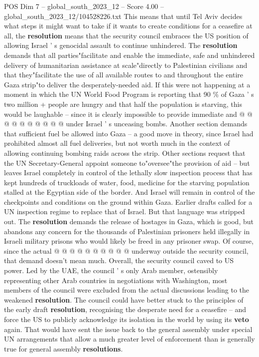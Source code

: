 \begin{textsample}{POS Dim 7 – global\_south\_2023\_12 – Score 4.00 – global\_south\_2023\_12/104528226.txt}
This means that until Tel Aviv decides what steps it might want to take if it wants to create conditions for a ceasefire at all, the \textbf{resolution} means that the security council embraces the US position of allowing Israel ' s genocidal assault to continue unhindered.
The \textbf{resolution} demands that all parties"facilitate and enable the immediate, safe and unhindered delivery of humanitarian assistance at scale"directly to Palestinian civilians and that they"facilitate the use of all available routes to and throughout the entire Gaza strip"to deliver the desperately-needed aid.
If this were not happening at a moment in which the UN World Food Program is reporting that 90 \% of Gaza ' s two million + people are hungry and that half the population is starving, this would be laughable -- since it is clearly impossible to provide immediate and @ @ @ @ @ @ @ @ @ @ under Israel ' s unceasing bombs.
Another section demands that sufficient fuel be allowed into Gaza -- a good move in theory, since Israel had prohibited almost all fuel deliveries, but not worth much in the context of allowing continuing bombing raids across the strip.
Other sections request that the UN Secretary-General appoint someone to"oversee"the provision of aid -- but leaves Israel completely in control of the lethally slow inspection process that has kept hundreds of truckloads of water, food, medicine for the starving population stalled at the Egyptian side of the border.
And Israel will remain in control of the checkpoints and conditions on the ground within Gaza.
Earlier drafts called for a UN inspection regime to replace that of Israel.
But that language was stripped out.
The \textbf{resolution} demands the release of hostages in Gaza, which is good, but abandons any concern for the thousands of Palestinian prisoners held illegally in Israeli military prisons who would likely be freed in any prisoner swap.
Of course, since the actual @ @ @ @ @ @ @ @ @ @ underway outside the security council, that demand doesn't mean much.
Overall, the security council caved to US power.
Led by the UAE, the council ' s only Arab member, ostensibly representing other Arab countries in negotiations with Washington, most members of the council were excluded from the actual discussions leading to the weakened \textbf{resolution}.
The council could have better stuck to the principles of the early draft \textbf{resolution}, recognising the desperate need for a ceasefire -- and force the US to publicly acknowledge its isolation in the world by using its \textbf{veto} again.
That would have sent the issue back to the general assembly under special UN arrangements that allow a much greater level of enforcement than is generally true for general assembly \textbf{resolutions}.

\end{textsample}
